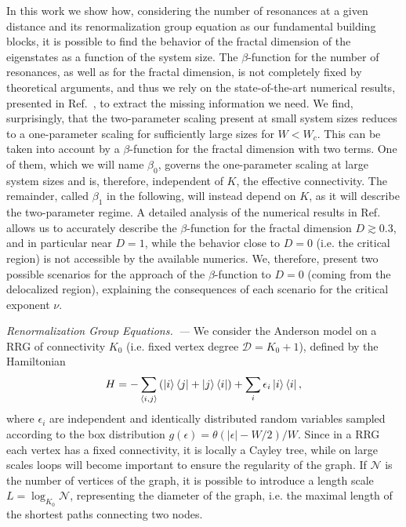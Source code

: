\documentclass[reprint,aps,prl,superscriptaddress,english,nolongbibliography]{revtex4-2}
\begin{document}
In this work we show how, considering the number of resonances at a given distance and its renormalization group equation as our fundamental building blocks, it is possible to find the behavior of the fractal dimension of the eigenstates as a function of the system size. 
The $\beta$-function for the number of resonances, as well as for the fractal dimension, is not completely fixed by theoretical arguments, and thus we rely on the state-of-the-art numerical results, presented in Ref.~\cite{sierant2023universality}, to extract the missing information we need. 
We find, surprisingly, that the two-parameter scaling present at small system sizes reduces to a one-parameter scaling for sufficiently large sizes for $W<W_c$. This can be taken into account by a $\beta$-function for the fractal dimension with two terms. 
One of them, which we will name $\beta_0$, governs the one-parameter scaling at large system sizes and is, therefore, independent of $K$, the effective connectivity. The remainder, called $\beta_1$ in the following, will instead depend on $K$, as it will describe the two-parameter regime.
A detailed analysis of the numerical results in Ref.~\cite{sierant2023universality} allows us to accurately describe the $\beta$-function for the fractal dimension $D\gtrsim 0.3$, and in particular near $D=1$, while the behavior close to $D=0$ (i.e. the critical region) is not accessible by the available numerics. We, therefore, present two possible scenarios for the approach of the $\beta$-function to $D=0$ (coming from the delocalized region), explaining the consequences of each scenario for the critical exponent $\nu$.


\emph{Renormalization Group Equations.~---} 
We consider the Anderson model on a RRG of connectivity $K_0$ (i.e. fixed vertex degree $\mathcal{D}=K_0+1$), defined by the Hamiltonian 
\begin{equation}
    H = - \sum_{\langle i,j \rangle} \left( \ket{i}\bra{j} + \ket{j}\bra{i} \right) + \sum_i \epsilon_i \ket{i} \bra{i},
\end{equation}
where $\epsilon_i$ are independent and identically distributed random variables sampled according to the box distribution $g(\epsilon) = \theta(|\epsilon|-W/2)/W$. Since in a RRG each vertex has a fixed connectivity, it is locally a Cayley tree, while on large scales loops will become important to ensure the regularity of the graph. If $\mathcal{N}$ is the number of vertices of the graph, it is possible to introduce a length scale $L = \log_{K_0} \mathcal{N}$, representing the diameter of the graph, i.e. the maximal length of the shortest paths connecting two nodes.
\end{document}
